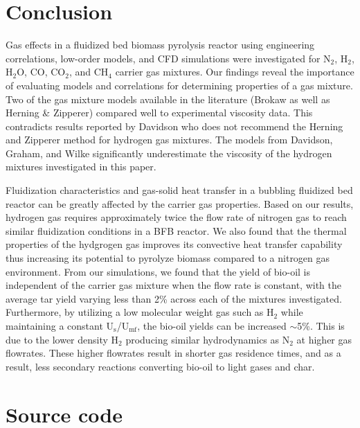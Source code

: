 \documentclass{article}
\begin{document}

\section{Conclusion}

Gas effects in a fluidized bed biomass pyrolysis reactor using engineering correlations, low-order models, and CFD simulations were investigated for N$_2$, H$_2$, H$_2$O, CO, CO$_2$, and CH$_4$ carrier gas mixtures. Our findings reveal the importance of evaluating models and correlations for determining properties of a gas mixture. Two of the gas mixture models available in the literature (Brokaw as well as Herning \& Zipperer) compared well to experimental viscosity data. This contradicts results reported by Davidson who does not recommend the Herning and Zipperer method for hydrogen gas mixtures. The models from Davidson, Graham, and Wilke significantly underestimate the viscosity of the hydrogen mixtures investigated in this paper.

Fluidization characteristics and gas-solid heat transfer in a bubbling fluidized bed reactor can be greatly affected by the carrier gas properties. Based on our results, hydrogen gas requires approximately twice the flow rate of nitrogen gas to reach similar fluidization conditions in a BFB reactor. We also found that the thermal properties of the hydgrogen gas improves its convective heat transfer capability thus increasing its potential to pyrolyze biomass compared to a nitrogen gas environment. From our simulations, we found that the yield of bio-oil is independent of the carrier gas mixture when the flow rate is constant, with the average tar yield varying less than 2\% across each of the mixtures investigated. Furthermore, by utilizing a low molecular weight gas such as H$_2$ while maintaining a constant U$_\text{s}$/U$_\text{mf}$, the bio-oil yields can be increased $\sim$5\%. This is due to the lower density H$_2$ producing similar hydrodynamics as N$_2$ at higher gas flowrates. These higher flowrates result in shorter gas residence times, and as a result, less secondary reactions converting bio-oil to light gases and char.


\section{Source code}
\end{document}
